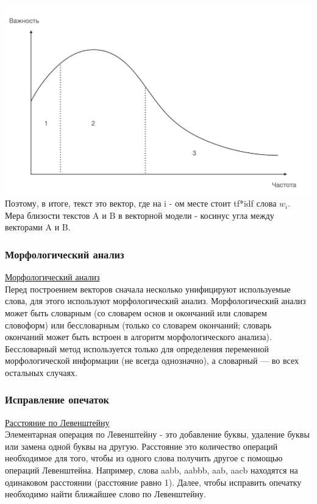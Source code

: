 \includegraphics[width=0.5\linewidth]{13/Zipf}
Поэтому, в итоге, текст это вектор, где на i - ом месте стоит tf*idf слова $w_i$. Мера близости текстов A и B в векторной модели - косинус угла между векторами A и B.

\subsubsection {Морфологический анализ}
\href{http://prutzkow.com/ru-ru/science/natural-language-processing/morphology/}{Морфологический анализ} \\
Перед построением векторов сначала несколько унифицируют используемые слова, для этого используют морфологический анализ.
Морфологический анализ может быть словарным (со словарем основ и окончаний или словарем словоформ) или бессловарным (только со словарем окончаний; словарь окончаний может быть встроен в алгоритм морфологического анализа). Бессловарный метод используется только для определения переменной морфологической информации (не всегда однозначно), а словарный — во всех остальных случаях. 

\subsubsection {Исправление опечаток}
\href{https://ru.wikipedia.org/wiki/Расстояние_Левенштейна}{Расстояние по Левенштейну} \\
Элементарная операция по Левенштейну - это добавление буквы, удаление буквы или замена одной буквы на другую. Расстояние это количество операций необходимое для того, чтобы из одного слова получить другое с помощью операций Левенштейна. Например, слова aabb, aabbb, aab, aacb находятся на одинаковом расстоянии (расстояние равно 1). Далее, чтобы исправить опечатку необходимо найти ближайшее слово по Левенштейну.

